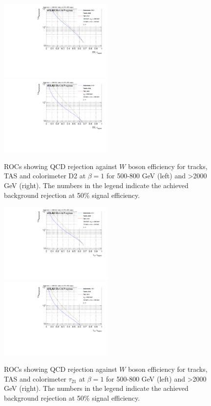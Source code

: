 \begin{figure}[htp]
\includegraphics[width=0.5\textwidth]{sascha_input/plots/W/beta1/ROC_ALL_h_recoJet_D2_bin2.pdf}
\includegraphics[width=0.5\textwidth]{sascha_input/plots/W/beta1/ROC_ALL_h_recoJet_D2_bin6.pdf}
\caption{\footnotesize{ROCs showing QCD rejection against $W$ boson efficiency for tracks, TAS and colorimeter D2 at $\beta=1$ for 500-800 GeV (left) and >2000 GeV (right). The numbers in the legend indicate the achieved background rejection at 50\% signal efficiency.}}\label{fig:ROC_W_D2}
\end{figure}

\begin{figure}[htp]
\includegraphics[width=0.5\textwidth]{sascha_input/plots/W/beta1/ROC_ALL_h_recoJet_nSub21_bin2.pdf}
\includegraphics[width=0.5\textwidth]{sascha_input/plots/W/beta1/ROC_ALL_h_recoJet_nSub21_bin6.pdf}
\caption{\footnotesize{ROCs showing QCD rejection against $W$ boson efficiency for tracks, TAS and colorimeter $\tau_{21}$ at $\beta=1$ for 500-800 GeV (left) and >2000 GeV (right). The numbers in the legend indicate the achieved background rejection at 50\% signal efficiency.}}\label{fig:ROC_W_nSub21}
\end{figure}

